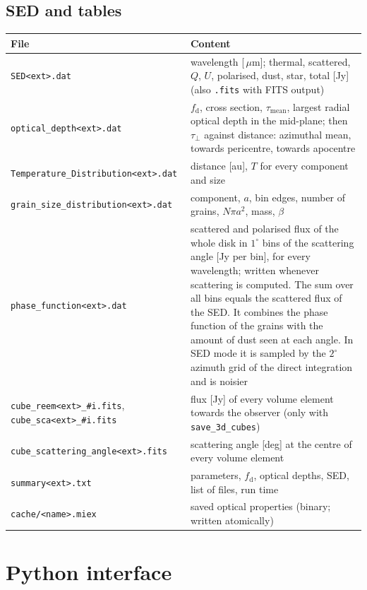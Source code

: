 \documentclass[11pt,a4paper]{article}
\newcommand{\code}[1]{\texttt{#1}}
\newcommand{\um}{\,$\mu$m}
\begin{document}
\subsection{SED and tables}

\small
\begin{longtable}{@{}R{6.1cm}R{8.8cm}@{}}
\toprule
File & Content \\
\midrule
\endhead
\code{SED<ext>.dat} & wavelength [\um]; thermal, scattered, $Q$, $U$, polarised, dust, star,
  total [Jy] (also \code{.fits} with FITS output) \\
\code{optical\_depth<ext>.dat} & $f_\mathrm{d}$, cross section, $\tau_\mathrm{mean}$, largest radial
  optical depth in the mid-plane; then
  $\tau_\perp$ against distance: azimuthal mean, towards pericentre, towards apocentre \\
\code{Temperature\_Distribution<ext>.dat} & distance [au], $T$ for every component and size \\
\code{grain\_size\_distribution<ext>.dat} & component, $a$, bin edges, number of grains,
  $N\pi a^2$, mass, $\beta$ \\
\code{phase\_function<ext>.dat} & scattered and polarised flux of the whole disk in $1^\circ$ bins
  of the scattering angle [Jy per bin], for every wavelength; written whenever scattering is
  computed. The sum over all bins equals the scattered flux of the SED. It combines the phase
  function of the grains with the amount of dust seen at each angle. In SED mode it is sampled by
  the $2^\circ$ azimuth grid of the direct integration and is noisier \\
\code{cube\_reem<ext>\_\#i.fits}, \code{cube\_sca<ext>\_\#i.fits} & flux [Jy] of every volume
  element towards the observer (only with \code{save\_3d\_cubes}) \\
\code{cube\_scattering\_angle<ext>.fits} & scattering angle [deg] at the centre of every volume
  element \\
\code{summary<ext>.txt} & parameters, $f_\mathrm{d}$, optical depths, SED, list of files, run time \\
\code{cache/<name>.miex} & saved optical properties (binary; written atomically) \\
\bottomrule
\end{longtable}
\normalsize

\section{Python interface}
\label{sec:python}
\end{document}

